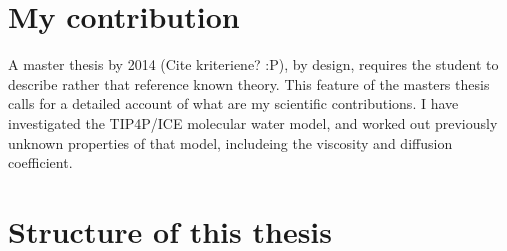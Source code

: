 \section{My contribution}
A master thesis by 2014 (Cite kriteriene? :P), by design, requires the student to describe rather that reference known theory. This feature of the masters thesis calls for a detailed account of what are my scientific contributions. I have investigated the TIP4P/ICE molecular water model, and worked out previously unknown properties of that model, includeing the viscosity and diffusion coefficient.

\section{Structure of this thesis}

